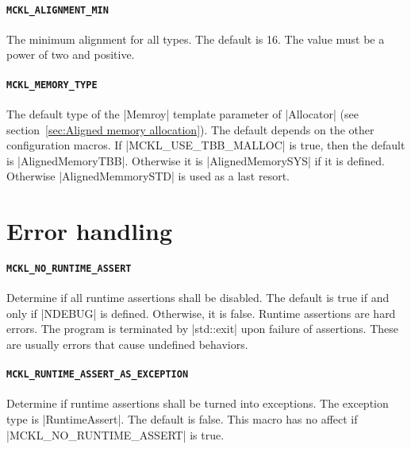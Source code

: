 \paragraph{\texttt{MCKL\_ALIGNMENT\_MIN}} The minimum alignment for all types.
The default is 16. The value must be a power of two and positive.

\paragraph{\texttt{MCKL\_MEMORY\_TYPE}} The default type of the |Memroy|
template parameter of |Allocator| (see section~\ref{sec:Aligned memory
  allocation}). The default depends on the other configuration macros. If
|MCKL_USE_TBB_MALLOC| is true, then the default is |AlignedMemoryTBB|.
Otherwise it is |AlignedMemorySYS| if it is defined. Otherwise
|AlignedMemmorySTD| is used as a last resort.

\section{Error handling}
\label{sec:Error handling}

\paragraph{\texttt{MCKL\_NO\_RUNTIME\_ASSERT}} Determine if all runtime
assertions shall be disabled. The default is true if and only if |NDEBUG| is
defined. Otherwise, it is false. Runtime assertions are hard errors. The
program is terminated by |std::exit| upon failure of assertions. These are
usually errors that cause undefined behaviors.

\paragraph{\texttt{MCKL\_RUNTIME\_ASSERT\_AS\_EXCEPTION}} Determine if runtime
assertions shall be turned into exceptions. The exception type is
|RuntimeAssert|. The default is false. This macro has no affect if
|MCKL_NO_RUNTIME_ASSERT| is true.
